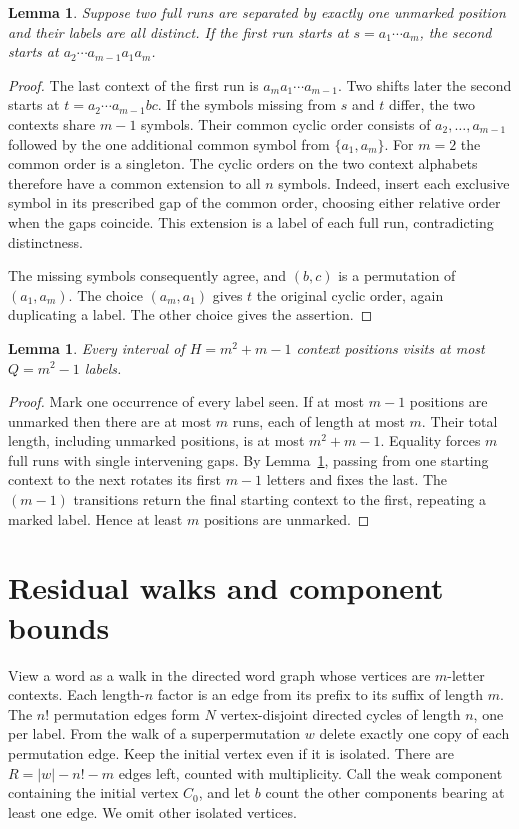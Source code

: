 \documentclass[11pt]{article}
\newtheorem{lemma}[theorem]{Lemma}
\begin{document}
\begin{lemma}\label{lem:seam}
Suppose two full runs are separated by exactly one unmarked position and their labels are all distinct. If the first run starts at $s=a_1\cdots a_m$, the second starts at $a_2\cdots a_{m-1}a_1a_m$.
\end{lemma}
\begin{proof}
The last context of the first run is $a_ma_1\cdots a_{m-1}$. Two shifts later the second starts at $t=a_2\cdots a_{m-1}bc$. If the symbols missing from $s$ and $t$ differ, the two contexts share $m-1$ symbols. Their common cyclic order consists of $a_2,\ldots,a_{m-1}$ followed by the one additional common symbol from $\{a_1,a_m\}$. For $m=2$ the common order is a singleton. The cyclic orders on the two context alphabets therefore have a common extension to all $n$ symbols. Indeed, insert each exclusive symbol in its prescribed gap of the common order, choosing either relative order when the gaps coincide. This extension is a label of each full run, contradicting distinctness.

The missing symbols consequently agree, and $(b,c)$ is a permutation of $(a_1,a_m)$. The choice $(a_m,a_1)$ gives $t$ the original cyclic order, again duplicating a label. The other choice gives the assertion.
\end{proof}

\begin{lemma}\label{lem:block}
Every interval of $H=m^2+m-1$ context positions visits at most $Q=m^2-1$ labels.
\end{lemma}
\begin{proof}
Mark one occurrence of every label seen. If at most $m-1$ positions are unmarked then there are at most $m$ runs, each of length at most $m$. Their total length, including unmarked positions, is at most $m^2+m-1$. Equality forces $m$ full runs with single intervening gaps. By Lemma~\ref{lem:seam}, passing from one starting context to the next rotates its first $m-1$ letters and fixes the last. The $(m-1)$ transitions return the final starting context to the first, repeating a marked label. Hence at least $m$ positions are unmarked.
\end{proof}

\section{Residual walks and component bounds}
View a word as a walk in the directed word graph whose vertices are $m$-letter contexts. Each length-$n$ factor is an edge from its prefix to its suffix of length $m$. The $n!$ permutation edges form $N$ vertex-disjoint directed cycles of length $n$, one per label. From the walk of a superpermutation $w$ delete exactly one copy of each permutation edge. Keep the initial vertex even if it is isolated. There are $R=|w|-n!-m$ edges left, counted with multiplicity. Call the weak component containing the initial vertex $C_0$, and let $b$ count the other components bearing at least one edge. We omit other isolated vertices.
\end{document}
